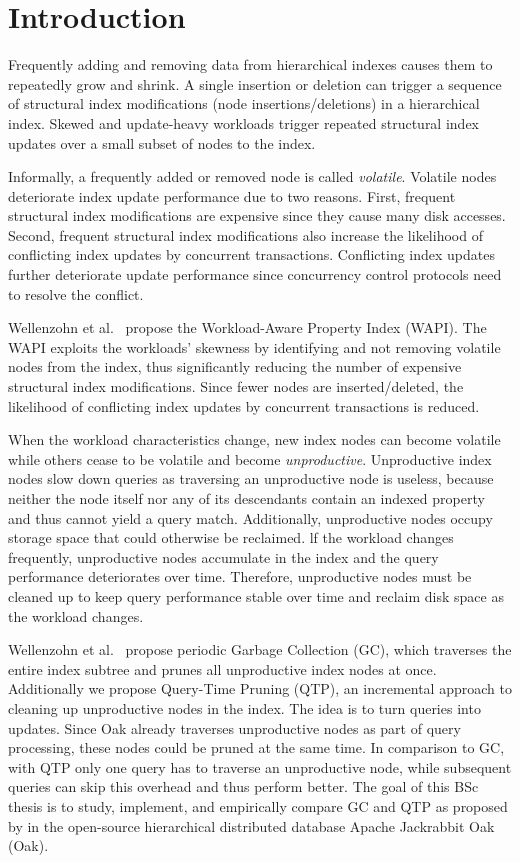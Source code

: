\documentclass[abstracton,12pt]{scrartcl}
\theoremstyle{definition}
\begin{document}
\section{Introduction}

Frequently adding and removing data from hierarchical indexes causes them to
repeatedly grow and shrink. A single insertion or deletion can trigger a
sequence of structural index modifications (node insertions/deletions) in a
hierarchical index. Skewed and update-heavy workloads trigger repeated
structural index updates over a small subset of nodes to the index.

Informally, a frequently added or removed node is called \textit{volatile}.
Volatile nodes deteriorate index update performance due to two reasons. First,
frequent structural index modifications are expensive since they cause many disk
accesses. Second, frequent structural index modifications also increase the
likelihood of conflicting index updates by concurrent transactions. Conflicting
index updates further deteriorate update performance since concurrency control
protocols need to resolve the conflict.

Wellenzohn et al.~\cite{KW17} propose the Workload-Aware Property Index (WAPI).
The WAPI exploits the workloads' skewness by identifying and not removing
volatile nodes from the index, thus significantly reducing the number of
expensive structural index modifications. Since fewer nodes are
inserted/deleted, the likelihood of conflicting index updates by concurrent
transactions is reduced.

When the workload characteristics change, new index nodes can become volatile
while others cease to be volatile and become \textit{unproductive}. Unproductive
index nodes slow down queries as traversing an unproductive node is useless,
because neither the node itself nor any of its descendants contain an indexed
property and thus cannot yield a query match. Additionally, unproductive nodes
occupy storage space that could otherwise be reclaimed. lf the workload changes
frequently, unproductive nodes accumulate in the index and the query
performance deteriorates over time. Therefore, unproductive nodes must be
cleaned up to keep query performance stable over time and reclaim disk space as
the workload changes.

Wellenzohn et al.~\cite{KW17} propose periodic Garbage Collection (GC), which
traverses the entire index subtree and prunes all unproductive index nodes at
once. Additionally we propose Query-Time Pruning (QTP), an incremental approach
to cleaning up unproductive nodes in the index. The idea is to turn queries into
updates. Since Oak already traverses unproductive nodes as part of query
processing, these nodes could be pruned at the same time. In comparison to GC,
with QTP only one query has to traverse an unproductive node, while subsequent
queries can skip this overhead and thus perform better.
The goal of this BSc thesis is to study, implement, and empirically compare GC
and QTP as proposed by \cite{KW17} in the open-source hierarchical distributed
database Apache Jackrabbit Oak (Oak).
\end{document}
